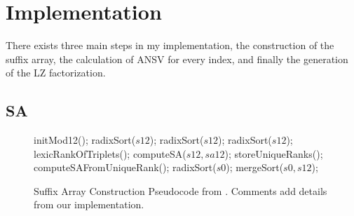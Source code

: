 \chapter{Implementation}
\label{chap:implementation}

There exists three main steps in my implementation, the construction of the suffix array, the calculation of ANSV for every index, and finally the generation of the LZ factorization.

\section{SA}

\begin{figure}[h]
\begin{algorithmic}[1]
\State initMod12();
\State radixSort($s12$);
\State radixSort($s12$); 
\State radixSort($s12$); 
\State lexicRankOfTriplets();
\State computeSA($s12,sa12$);
\State storeUniqueRanks();
\Else
\State computeSAFromUniqueRank();
\EndIf
\State radixSort($s0$); 
\State mergeSort($s0,s12$); 
\EndProcedure
\end{algorithmic}
\caption{Suffix Array Construction Pseudocode from \cite{Deo}. Comments add details from our implementation.}
\label{algorithm:sa}
\end{figure}


